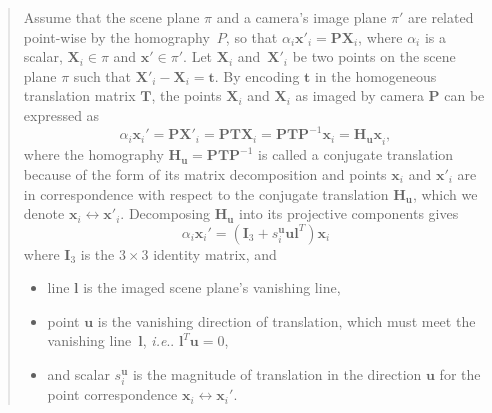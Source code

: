 \documentclass[11pt,a4paper]{article}
\makeatletter
\theoremstyle{definition}
\newcommand{\T}{T}
\newcommand{\mat}[1]{\bm{#1}}
\DeclareRobustCommand\ie{\emph{i.e}\@ifnextchar.{}{.\@}}
\makeatother
\begin{document}
\begin{quote}
Assume that the scene plane $\pi$ and a camera's image plane $\pi'$ are related point-wise by the
homography~$P$, so that $\alpha_i\mat{x}'_i=\mat{PX}_i$, where $\alpha_i$ is a scalar, 
$\mat{X}_i\in\pi$ and $\mat{x}'\in\pi'$. Let $\mat{X}_i$ and~$\mat{X}'_i$ be two points on the
scene plane $\pi$ such that $\mat{X}'_i -\mat{X}_i=\mat{t}$. By encoding $\mat{t}$ in the
homogeneous translation matrix $\mat{T}$, the points $\mat{X}_i$ and $\mat{X}_i$ as imaged by
camera $\mat{P}$ can be expressed as
\begin{equation}
    \alpha_i\mat{x}_i' = \mat{PX}'_i = \mat{PTX}_i = \mat{PTP}^{-1}\mat{x}_i=\mat{H_ux}_i,
\end{equation}
where the homography $\mat{H_u}=\mat{PTP}^{-1}$ is called a conjugate translation because of the
form of its matrix decomposition and points $\mat{x}_i$ and $\mat{x}'_i$ are in correspondence
with respect to the conjugate translation $\mat{H_u}$, which we denote $\mat{x}_i\leftrightarrow\mat{x}'_i$.
Decomposing $\mat{H_u}$ into its projective components gives
\begin{equation}
\alpha_i\mat{x}_i' = \left(\mat{I}_3+s_i^{\mat{u}}\mat{ul}^\T\right)\mat{x}_i
\end{equation}
where $\mat{I}_3$ is the $3\times 3$ identity matrix, and
\begin{itemize}
\item line $\mat{l}$ is the imaged scene plane’s vanishing line,
\item point $\mat{u}$ is the vanishing direction of translation, which must meet the vanishing
      line~$\mat{l}$, \ie{} $\mat{l}^\T\mat{u} = 0$,
\item and scalar $s_i^{\mat{u}}$ is the magnitude of translation in the direction $\mat{u}$ for
      the point correspondence $\mat{x}_i\leftrightarrow\mat{x}_i'$.
\end{itemize}
\end{quote}
\end{document}
